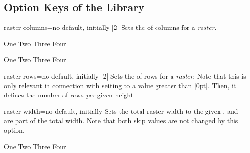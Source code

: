 \clearpage
\subsection{Option Keys of the Library}\label{subsec:raster_options}

\begin{docTcbKey}[][doc new=2014-11-10]{raster columns}{=}{no default, initially |2|}
  Sets the  of columns for a \emph{raster}.
\begin{dispExample}
\begin{tcbitemize}[raster columns=3,
  size=small,colframe=red!50!black,colback=red!10!white]
  \tcbitem One
  \tcbitem Two
  \tcbitem Three
  \tcbitem Four
\end{tcbitemize}
\begin{tcbitemize}[raster columns=4,
  size=small,colframe=blue!50!black,colback=blue!10!white]
  \tcbitem One
  \tcbitem Two
  \tcbitem Three
  \tcbitem Four
\end{tcbitemize}
\end{dispExample}
\end{docTcbKey}

\begin{docTcbKey}[][doc new=2014-11-10]{raster rows}{=}{no default, initially |2|}
  Sets the  of rows for a \emph{raster}.
  Note that this is only relevant in connection with setting 
  to a value greater than |0pt|. Then, it defines the number of rows \emph{per} given
  height.
\end{docTcbKey}


\begin{docTcbKey}[][doc new=2014-11-10]{raster width}{=}{no default, initially }
  Sets the total raster width to the given .
   and  are part
  of the total width. Note that both skip values are not changed by this option.
\begin{dispExample}
\begin{tcbitemize}[raster width=\linewidth/2,
  size=small,colframe=red!50!black,colback=red!10!white]
  \tcbitem One
  \tcbitem Two
  \tcbitem Three
  \tcbitem Four
\end{tcbitemize}
\end{dispExample}
\end{docTcbKey}


